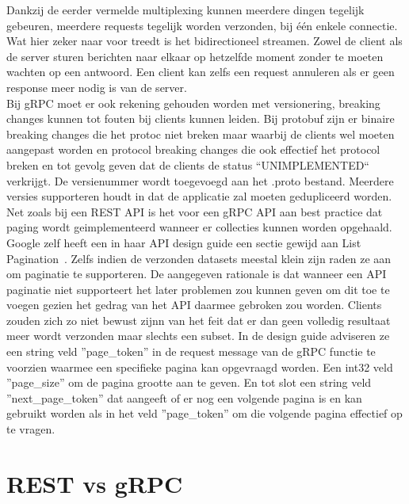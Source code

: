 Dankzij de eerder vermelde multiplexing kunnen meerdere dingen tegelijk gebeuren, meerdere requests tegelijk worden verzonden, bij \'e\'en enkele connectie.
Wat hier zeker naar voor treedt is het bidirectioneel streamen. Zowel de client als de server sturen berichten naar elkaar op hetzelfde moment zonder te moeten wachten
op een antwoord. Een client kan zelfs een request annuleren als er geen response meer nodig is van de server.\newline
~\autocite{freecodecamp}\\

Bij gRPC moet er ook rekening gehouden worden met versionering, breaking changes kunnen tot fouten bij clients kunnen leiden.
Bij protobuf zijn er binaire breaking changes die het protoc niet breken maar waarbij de clients wel moeten aangepast worden en protocol breaking changes
die ook effectief het protocol breken en tot gevolg geven dat de clients de status ``UNIMPLEMENTED`` verkrijgt. De versienummer wordt toegevoegd aan
het .proto bestand. Meerdere versies supporteren houdt in dat de applicatie zal moeten gedupliceerd worden.\\

Net zoals bij een REST API is het voor een gRPC API aan best practice dat paging wordt geimplementeerd wanneer er collecties kunnen worden opgehaald.
Google zelf heeft een in haar API design guide een sectie gewijd aan List Pagination~\parencite{googlepaging}. Zelfs indien de verzonden datasets meestal
klein zijn raden ze aan om paginatie te supporteren. De aangegeven rationale is dat wanneer een API paginatie niet supporteert het later
problemen zou kunnen geven om dit toe te voegen gezien het gedrag van het API daarmee gebroken zou worden. Clients zouden zich zo niet bewust zijnn van het feit
dat er dan geen volledig resultaat meer wordt verzonden maar slechts een subset. In de design guide adviseren ze een string veld ''page\_token'' in de request message
van de gRPC functie te voorzien waarmee een specifieke pagina kan opgevraagd worden. Een int32 veld ''page\_size'' om de pagina grootte aan te geven.
En tot slot een string veld ''next\_page\_token'' dat aangeeft of er nog een volgende pagina is en kan gebruikt worden als in het veld ''page\_token''
om die volgende pagina effectief op te vragen.\newline
~\autocite{grpcversion}\\


\section{REST vs gRPC}


